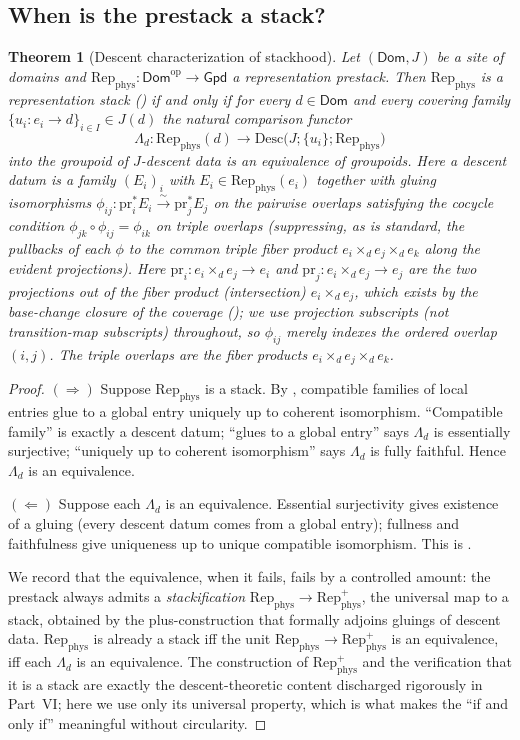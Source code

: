 \documentclass[12pt]{article}
\newtheorem{theorem}{Theorem}[section]
\theoremstyle{definition}
\theoremstyle{remark}
\newcommand{\Dom}{\mathsf{Dom}}
\newcommand{\Gpd}{\mathsf{Gpd}}
\newcommand{\Repphys}{\mathrm{Rep}_{\mathrm{phys}}}
\newcommand{\op}{\mathrm{op}}
\begin{document}
\subsection{When is the prestack a stack?}

\begin{theorem}[Descent characterization of stackhood]
\label{thm:descent}
Let $(\Dom, J)$ be a site of domains and $\Repphys : \Dom^{\op} \to \Gpd$ a
representation prestack. Then $\Repphys$ is a representation stack
() if and only if for every $d \in \Dom$ and every covering
family $\{u_i : e_i \to d\}_{i \in I} \in J(d)$ the natural comparison functor
\[
  \Lambda_d : \Repphys(d) \longrightarrow \mathrm{Desc}\bigl(J; \{u_i\}; \Repphys\bigr)
\]
into the groupoid of $J$-descent data is an equivalence of groupoids. Here a
descent datum is a family $(E_i)_{i}$ with $E_i \in \Repphys(e_i)$ together with
gluing isomorphisms $\phi_{ij} : \mathrm{pr}_i^\ast E_i \xrightarrow{\sim}
\mathrm{pr}_j^\ast E_j$ on the pairwise overlaps satisfying the cocycle condition
$\phi_{jk}\circ\phi_{ij} = \phi_{ik}$ on triple overlaps (suppressing, as is
standard, the pullbacks of each $\phi$ to the common triple fiber product
$e_i \times_d e_j \times_d e_k$ along the evident projections). Here
$\mathrm{pr}_i : e_i \times_d e_j \to e_i$ and
$\mathrm{pr}_j : e_i \times_d e_j \to e_j$ are the two projections out of the
fiber product (intersection) $e_i \times_d e_j$, which exists by the base-change
closure of the coverage (); we use projection subscripts
(not transition-map subscripts) throughout, so $\phi_{ij}$ merely indexes the
ordered overlap $(i,j)$. The triple overlaps are the fiber products
$e_i \times_d e_j \times_d e_k$.
\end{theorem}

\begin{proof}
$(\Rightarrow)$ Suppose $\Repphys$ is a stack. By , compatible
families of local entries glue to a global entry uniquely up to coherent
isomorphism. ``Compatible family'' is exactly a descent datum; ``glues to a
global entry'' says $\Lambda_d$ is essentially surjective; ``uniquely up to
coherent isomorphism'' says $\Lambda_d$ is fully faithful. Hence $\Lambda_d$ is
an equivalence.

$(\Leftarrow)$ Suppose each $\Lambda_d$ is an equivalence. Essential
surjectivity gives existence of a gluing (every descent datum comes from a global
entry); fullness and faithfulness give uniqueness up to unique compatible
isomorphism. This is .

We record that the equivalence, when it fails, fails by a controlled amount: the
prestack always admits a \emph{stackification} $\Repphys \to \Repphys^{+}$, the
universal map to a stack, obtained by the plus-construction that formally adjoins
gluings of descent data. $\Repphys$ is already a stack iff the unit
$\Repphys \to \Repphys^{+}$ is an equivalence, iff each $\Lambda_d$ is an
equivalence. The construction of $\Repphys^{+}$ and the verification that it is a
stack are exactly the descent-theoretic content discharged rigorously in Part~VI;
here we use only its universal property, which is what makes the ``if and only
if'' meaningful without circularity.
\end{proof}
\end{document}
